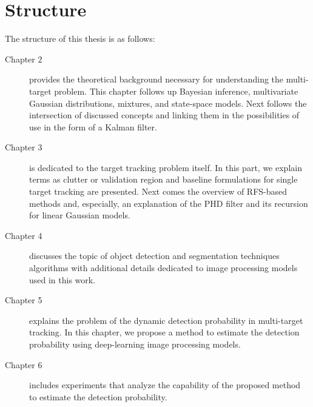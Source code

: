 \section{Structure}
The structure of this thesis is as follows:
\begin{description}
  \item[Chapter 2] provides the theoretical background necessary for understanding the multi-target problem.
  This chapter follows up Bayesian inference, multivariate Gaussian distributions, mixtures, and state-space models.
  Next follows the intersection of discussed concepts and linking them in the possibilities of use in the form of a
  Kalman filter.

  \item[Chapter 3] is dedicated to the target tracking problem itself. In this part, we explain terms as clutter or
  validation region and baseline formulations for single target tracking are presented. Next comes the overview of
  RFS-based
  methods and, especially, an explanation of the PHD filter and its recursion for linear Gaussian models.

  \item[Chapter 4] discusses the topic of object detection and segmentation techniques algorithms with additional
  details
  dedicated to image processing models used in this work.

  \item[Chapter 5] explains the problem of the dynamic detection probability in multi-target tracking. In this
  chapter, we
  propose a method to estimate the detection probability using deep-learning image processing models.
  \item[Chapter 6] includes experiments that analyze the capability of the proposed method to estimate the detection
  probability.
\end{description}

